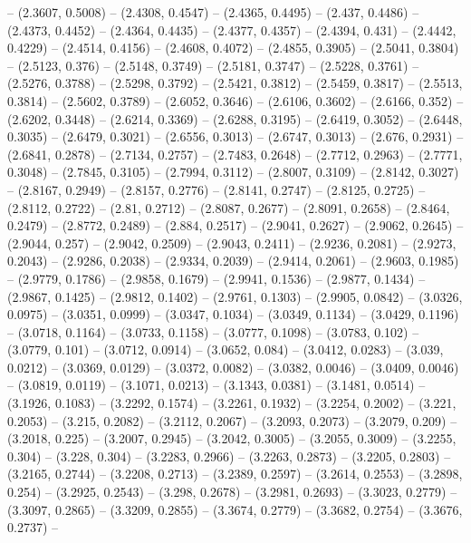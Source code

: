 {   -- (2.3607, 0.5008) -- (2.4308, 0.4547) -- (2.4365, 0.4495) -- (2.437, 
  0.4486) -- (2.4373, 0.4452) -- (2.4364, 0.4435) -- (2.4377, 0.4357) -- 
  (2.4394, 0.431) -- (2.4442, 0.4229) -- (2.4514, 0.4156) -- (2.4608, 0.4072) --
   (2.4855, 0.3905) -- (2.5041, 0.3804) -- (2.5123, 0.376) -- (2.5148, 0.3749) 
  -- (2.5181, 0.3747) -- (2.5228, 0.3761) -- (2.5276, 0.3788) -- (2.5298, 
  0.3792) -- (2.5421, 0.3812) -- (2.5459, 0.3817) -- (2.5513, 0.3814) -- 
  (2.5602, 0.3789) -- (2.6052, 0.3646) -- (2.6106, 0.3602) -- (2.6166, 0.352) --
   (2.6202, 0.3448) -- (2.6214, 0.3369) -- (2.6288, 0.3195) -- (2.6419, 0.3052) 
  -- (2.6448, 0.3035) -- (2.6479, 0.3021) -- (2.6556, 0.3013) -- (2.6747, 
  0.3013) -- (2.676, 0.2931) -- (2.6841, 0.2878) -- (2.7134, 0.2757) -- (2.7483,
   0.2648) -- (2.7712, 0.2963) -- (2.7771, 0.3048) -- (2.7845, 0.3105) -- 
  (2.7994, 0.3112) -- (2.8007, 0.3109) -- (2.8142, 0.3027) -- (2.8167, 0.2949) 
  -- (2.8157, 0.2776) -- (2.8141, 0.2747) -- (2.8125, 0.2725) -- (2.8112, 
  0.2722) -- (2.81, 0.2712) -- (2.8087, 0.2677) -- (2.8091, 0.2658) -- (2.8464, 
  0.2479) -- (2.8772, 0.2489) -- (2.884, 0.2517) -- (2.9041, 0.2627) -- (2.9062,
   0.2645) -- (2.9044, 0.257) -- (2.9042, 0.2509) -- (2.9043, 0.2411) -- 
  (2.9236, 0.2081) -- (2.9273, 0.2043) -- (2.9286, 0.2038) -- (2.9334, 0.2039) 
  -- (2.9414, 0.2061) -- (2.9603, 0.1985) -- (2.9779, 0.1786) -- (2.9858, 
  0.1679) -- (2.9941, 0.1536) -- (2.9877, 0.1434) -- (2.9867, 0.1425) -- 
  (2.9812, 0.1402) -- (2.9761, 0.1303) -- (2.9905, 0.0842) -- (3.0326, 0.0975) 
  -- (3.0351, 0.0999) -- (3.0347, 0.1034) -- (3.0349, 0.1134) -- (3.0429, 
  0.1196) -- (3.0718, 0.1164) -- (3.0733, 0.1158) -- (3.0777, 0.1098) -- 
  (3.0783, 0.102) -- (3.0779, 0.101) -- (3.0712, 0.0914) -- (3.0652, 0.084) -- 
  (3.0412, 0.0283) -- (3.039, 0.0212) -- (3.0369, 0.0129) -- (3.0372, 0.0082) --
   (3.0382, 0.0046) -- (3.0409, 0.0046) -- (3.0819, 0.0119) -- (3.1071, 0.0213) 
  -- (3.1343, 0.0381) -- (3.1481, 0.0514) -- (3.1926, 0.1083) -- (3.2292, 
  0.1574) -- (3.2261, 0.1932) -- (3.2254, 0.2002) -- (3.221, 0.2053) -- (3.215, 
  0.2082) -- (3.2112, 0.2067) -- (3.2093, 0.2073) -- (3.2079, 0.209) -- (3.2018,
   0.225) -- (3.2007, 0.2945) -- (3.2042, 0.3005) -- (3.2055, 0.3009) -- 
  (3.2255, 0.304) -- (3.228, 0.304) -- (3.2283, 0.2966) -- (3.2263, 0.2873) -- 
  (3.2205, 0.2803) -- (3.2165, 0.2744) -- (3.2208, 0.2713) -- (3.2389, 0.2597) 
  -- (3.2614, 0.2553) -- (3.2898, 0.254) -- (3.2925, 0.2543) -- (3.298, 0.2678) 
  -- (3.2981, 0.2693) -- (3.3023, 0.2779) -- (3.3097, 0.2865) -- (3.3209, 
  0.2855) -- (3.3674, 0.2779) -- (3.3682, 0.2754) -- (3.3676, 0.2737) -- 
}
